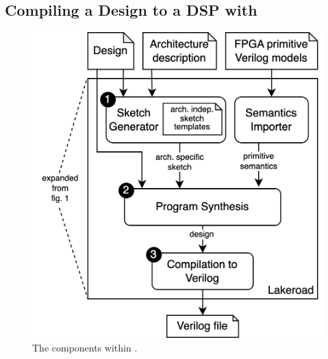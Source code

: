 
  
\subsection{Compiling a Design to a DSP with \lr}
\label{sec:overview-part-2}
\begin{figure}
    \centering
    \hspace{-1cm}%
    \includegraphics[width=0.85\columnwidth]{assets/lakeroad-diagram.drawio.png}
   \caption{The components within \lr.}
    \label{fig:lakeroad-diagram}
\end{figure}

